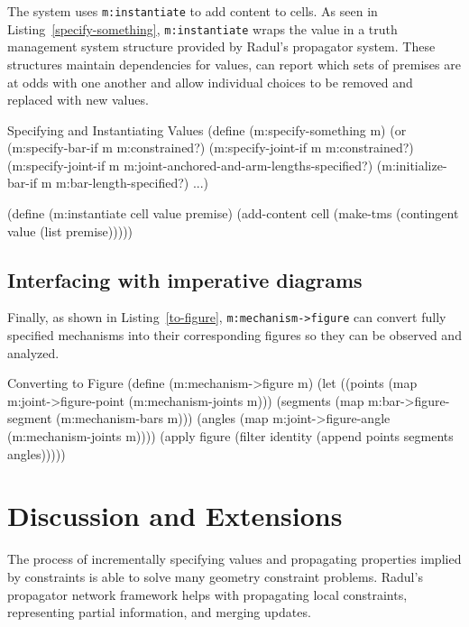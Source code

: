The system uses \texttt{m:instantiate} to add content to cells. As
seen in Listing~\ref{specify-something}, \texttt{m:instantiate} wraps
the value in a truth management system structure provided by Radul's
propagator system. These structures maintain dependencies for values, can report
which sets of premises are at odds with one another and allow
individual choices to be removed and replaced with new values.
\enlargethispage*{\baselineskip}
\begin{code-listing}
[label=specify-something]
{Specifying and Instantiating Values}
(define (m:specify-something m)
  (or
   (m:specify-bar-if m m:constrained?)
   (m:specify-joint-if m m:constrained?)
   (m:specify-joint-if m m:joint-anchored-and-arm-lengths-specified?)
   (m:initialize-bar-if m m:bar-length-specified?)
   ...)

(define (m:instantiate cell value premise)
  (add-content cell (make-tms (contingent value (list premise)))))
\end{code-listing}

\subsection{Interfacing with imperative diagrams}

Finally, as shown in Listing~\ref{to-figure},
\texttt{m:mechanism->figure} can convert fully specified mechanisms
into their corresponding figures so they can be observed and analyzed.

\begin{code-listing}
[label=to-figure]
{Converting to Figure}
(define (m:mechanism->figure m)
  (let ((points (map m:joint->figure-point (m:mechanism-joints m)))
        (segments (map m:bar->figure-segment (m:mechanism-bars m)))
        (angles (map m:joint->figure-angle (m:mechanism-joints m))))
    (apply figure (filter identity (append points segments angles)))))
\end{code-listing}

\section{Discussion and Extensions}

The process of incrementally specifying values and propagating
properties implied by constraints is able to solve many geometry
constraint problems. Radul's propagator network framework helps with
propagating local constraints, representing partial information, and
merging updates.

